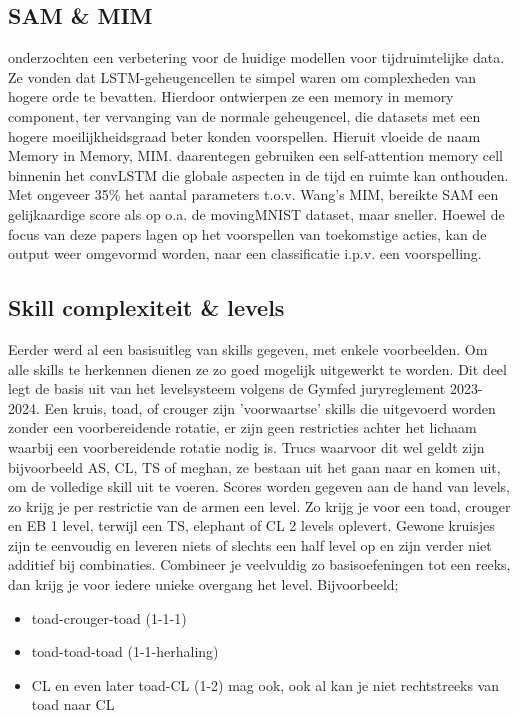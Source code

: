 \subsection{SAM \& MIM}
\label{subsec:SAM&MIM}

\textcite{Wang_2019} onderzochten een verbetering voor de huidige modellen voor tijdruimtelijke data. Ze vonden dat LSTM-geheugencellen te simpel waren om complexheden van hogere orde te bevatten. Hierdoor ontwierpen ze een memory in memory component, ter vervanging van de normale geheugencel, die datasets met een hogere moeilijkheidsgraad beter konden voorspellen. Hieruit vloeide de naam Memory in Memory, MIM.
\textcite{Lin_2020} daarentegen gebruiken een self-attention memory cell binnenin het convLSTM die globale aspecten in de tijd en ruimte kan onthouden. Met ongeveer 35\% het aantal parameters t.o.v. Wang's MIM, bereikte SAM een gelijkaardige score als op o.a. de movingMNIST dataset, maar sneller. Hoewel de focus van deze papers lagen op het voorspellen van toekomstige acties, kan de output weer omgevormd worden, naar een classificatie i.p.v. een voorspelling.


\subsection{Skill complexiteit \& levels}
\label{subsec:skillcomplexiteit}

Eerder werd al een basisuitleg van skills gegeven, met enkele voorbeelden. Om alle skills te herkennen dienen ze zo goed mogelijk uitgewerkt te worden. Dit deel legt de basis uit van het levelsysteem volgens de Gymfed juryreglement 2023-2024.
Een kruis, toad, of crouger zijn 'voorwaartse' skills die uitgevoerd worden zonder een voorbereidende rotatie, er zijn geen restricties achter het lichaam waarbij een voorbereidende rotatie nodig is. Trucs waarvoor dit wel geldt zijn bijvoorbeeld AS, CL, TS of meghan, ze bestaan uit het gaan naar en komen uit, om de volledige skill uit te voeren. Scores worden gegeven aan de hand van levels, zo krijg je per restrictie van de armen een level. Zo krijg je voor een toad, crouger en EB 1 level, terwijl een TS, elephant of CL 2 levels oplevert.
Gewone kruisjes zijn te eenvoudig en leveren niets of slechts een half level op en zijn verder niet additief bij combinaties. Combineer je veelvuldig zo basisoefeningen tot een reeks, dan krijg je voor iedere unieke overgang het level. Bijvoorbeeld;

\begin{itemize}
    \item toad-crouger-toad (1-1-1)
    \item toad-toad-toad (1-1-herhaling)
    \item CL en even later toad-CL (1-2) mag ook, ook al kan je niet rechtstreeks van toad naar CL
\end{itemize}

